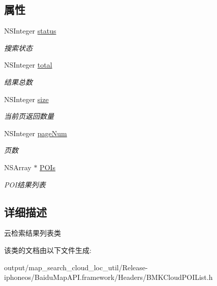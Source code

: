 \subsection*{属性}
\begin{DoxyCompactItemize}
\item 
\hypertarget{interface_b_m_k_cloud_p_o_i_list_a9a0761aa32216b6d96a3f3d538d8f2db}{}N\+S\+Integer \hyperlink{interface_b_m_k_cloud_p_o_i_list_a9a0761aa32216b6d96a3f3d538d8f2db}{status}\label{interface_b_m_k_cloud_p_o_i_list_a9a0761aa32216b6d96a3f3d538d8f2db}

\begin{DoxyCompactList}\small\item\em 搜索状态 \end{DoxyCompactList}\item 
\hypertarget{interface_b_m_k_cloud_p_o_i_list_a71aa046e96ad04026feb159383d3f615}{}N\+S\+Integer \hyperlink{interface_b_m_k_cloud_p_o_i_list_a71aa046e96ad04026feb159383d3f615}{total}\label{interface_b_m_k_cloud_p_o_i_list_a71aa046e96ad04026feb159383d3f615}

\begin{DoxyCompactList}\small\item\em 结果总数 \end{DoxyCompactList}\item 
\hypertarget{interface_b_m_k_cloud_p_o_i_list_a2d38d103dd34862c538ed99a635aafb5}{}N\+S\+Integer \hyperlink{interface_b_m_k_cloud_p_o_i_list_a2d38d103dd34862c538ed99a635aafb5}{size}\label{interface_b_m_k_cloud_p_o_i_list_a2d38d103dd34862c538ed99a635aafb5}

\begin{DoxyCompactList}\small\item\em 当前页返回数量 \end{DoxyCompactList}\item 
\hypertarget{interface_b_m_k_cloud_p_o_i_list_a1301275f0561c350c223dcf838502df8}{}N\+S\+Integer \hyperlink{interface_b_m_k_cloud_p_o_i_list_a1301275f0561c350c223dcf838502df8}{page\+Num}\label{interface_b_m_k_cloud_p_o_i_list_a1301275f0561c350c223dcf838502df8}

\begin{DoxyCompactList}\small\item\em 页数 \end{DoxyCompactList}\item 
\hypertarget{interface_b_m_k_cloud_p_o_i_list_a682ea5efc9695565e9ceacc9553d436d}{}N\+S\+Array $\ast$ \hyperlink{interface_b_m_k_cloud_p_o_i_list_a682ea5efc9695565e9ceacc9553d436d}{P\+O\+Is}\label{interface_b_m_k_cloud_p_o_i_list_a682ea5efc9695565e9ceacc9553d436d}

\begin{DoxyCompactList}\small\item\em P\+O\+I结果列表 \end{DoxyCompactList}\end{DoxyCompactItemize}


\subsection{详细描述}
云检索结果列表类 

该类的文档由以下文件生成\+:\begin{DoxyCompactItemize}
\item 
output/map\+\_\+search\+\_\+cloud\+\_\+loc\+\_\+util/\+Release-\/iphoneos/\+Baidu\+Map\+A\+P\+I.\+framework/\+Headers/B\+M\+K\+Cloud\+P\+O\+I\+List.\+h\end{DoxyCompactItemize}
